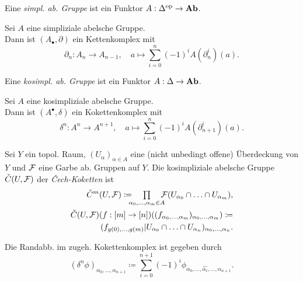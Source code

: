 \documentclass{cheat-sheet}
\newcommand{\nspace}[1]{\foreach \i in {1,...,#1}{ \! }} %
\begin{document}


\begin{defn}
  Eine \emph{simpl. ab. Gruppe} ist ein Funktor
  $A : \Delta^{\mathrm{op}} \to \mathbf{Ab}$.
\end{defn}

\begin{defn}
  Sei $A$ eine simpliziale abelsche Gruppe. \\
  Dann ist $(A_\bullet, \partial)$ ein Kettenkomplex mit
  \[
    \partial_n : A_n \to A_{n-1}, \quad
    a \mapsto \sum_{i=0}^n (-1)^i A(\partial_n^i)(a).
  \]
\end{defn}

\begin{defn}
  Eine \emph{kosimpl. ab. Gruppe} ist ein Funktor
  $A : \Delta \to \mathbf{Ab}$.
\end{defn}

\begin{defn}
  Sei $A$ eine kosimpliziale abelsche Gruppe. \\
  Dann ist $(A^\bullet, \delta)$ ein Kokettenkomplex mit
  \[
    \delta^n : A^n \to A^{n+1}, \quad
    a \mapsto \sum_{i=0}^n (-1)^i A(\partial_{n+1}^i)(a).
  \]
\end{defn}


\begin{defn}
  Sei $Y$ ein topol. Raum, $(U_\alpha)_{\alpha \in A}$ eine (nicht unbedingt offene) Überdeckung von $Y$ und $\mathcal{F}$ eine Garbe ab. Gruppen auf $Y$. Die kosimpliziale abelsche Gruppe $\check{C}(U, \mathcal{F})$ der \emph{Čech-Koketten} ist
  \begin{align*}
    \check{C}^m(U, \Fais) \coloneqq \nspace{4} \prod_{\alpha_0, \ldots, \alpha_m \in A} \nspace{4} \Fais(U_{\alpha_0} \cap \ldots \cap U_{\alpha_m}), \\
    \check{C}(U, \Fais)(f : [m] \to [n])((f_{\alpha_0, \ldots ,\alpha_m})_{\alpha_0, \ldots, \alpha_m}) \coloneqq \\
    (f_{g(0), \ldots, g(m)}|U_{\alpha_0} \cap \ldots \cap U_{\alpha_n})_{\alpha_0, \nldots, \alpha_n}.
  \end{align*}
\end{defn}

\begin{bem}
  Die Randabb. im zugeh. Kokettenkomplex ist gegeben durch
  \[ (\delta^n \phi)_{\alpha_0, \ldots, \alpha_{n+1}} \coloneqq \sum_{i=0}^{n+1} (-1)^i \phi_{\alpha_0, \ldots, \hat{\alpha_i}, \ldots, \alpha_{n+1}}. \]
\end{bem}
\end{document}

